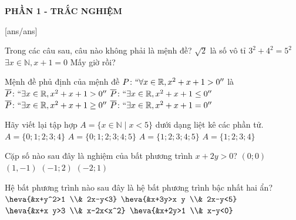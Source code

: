 
\begin{center}
	\textbf{PHẦN 1 - TRẮC NGHIỆM}
\end{center}
[ans/ans]
\begin{ex}%
Trong các câu sau, câu nào không phải là mệnh đề?
\choice
{$\sqrt{2}$ là số vô tỉ}
{$3^2+4^2=5^2$}
{$\exists x \in \mathbb{N}, x+1=0$}
{\True Mấy giờ rồi?}
\end{ex}
\begin{ex}%
Mệnh đề phủ định của mệnh đề $P\colon ``\forall x \in \mathbb{R}, x^2+x+1>0''$ là
\choice
{$\overline{P}\colon `` \exists x \in \mathbb{R}, x^2+x+1>0 ''$}
{\True $\overline{P}\colon `` \exists x \in \mathbb{R}, x^2+x+1 \leq 0 ''$}
{$\overline{P}\colon `` \exists x \in \mathbb{R}, x^2+x+1 \geq 0 ''$}
{$\overline{P}\colon `` \exists x \in \mathbb{R}, x^2+x+1=0 ''$}
\end{ex}
\begin{ex}%
Hãy viết lại tập hợp $A=\{x \in \mathbb{N} \mid x<5\}$ dưới dạng liệt kê các phần tử.
\choice
{\True $A=\{0;1;2;3;4\}$}
{$A=\{0;1;2;3;4;5\}$}
{$A=\{1;2;3;4;5\}$}
{$A=\{1;2;3;4\}$}
\end{ex}
\begin{ex}%
Cặp số nào sau đây là nghiệm của bất phương trình $x+2y>0$?
\choice
{$(0;0)$}
{$(1,-1)$}
{\True $(-1;2)$}
{$(-2;1)$}
\end{ex}
\begin{ex}%
Hệ bất phương trình nào sau đây là hệ bất phương trình bậc nhất hai ẩn?
\choice
{$\heva{&x+y^2>1 \\& 2x-y<3}$}
{$\heva{&x+3y>x y \\& 2x-y<5}$}
{$\heva{&x+x y>3 \\& x-2x<x^2}$}
{\True $\heva{&x+2y>1 \\& x-y<0}$}
\end{ex}
